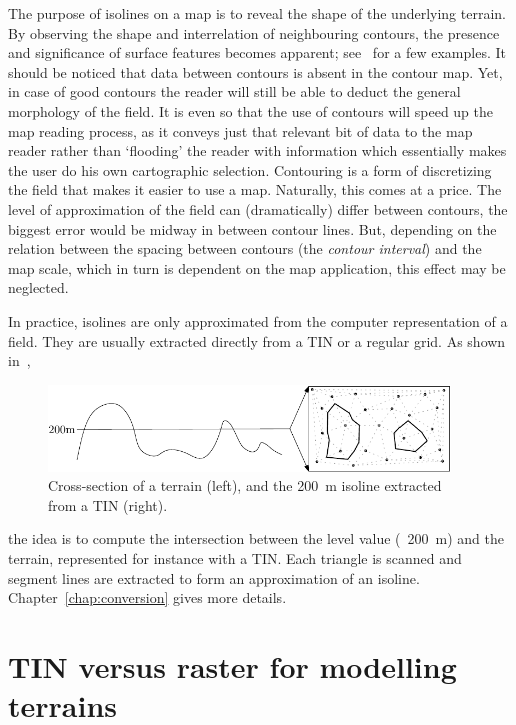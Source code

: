The purpose of isolines on a map is to reveal the shape of the underlying terrain. 
By observing the shape and interrelation of neighbouring contours, the presence and significance of surface features becomes apparent; see~ for a few examples.
It should be noticed that data between contours is absent in the contour map. 
Yet, in case of good contours the reader will still be able to deduct the general morphology of the field. 
It is even so that the use of contours will speed up the map reading process, as it conveys just that relevant bit of data to the map reader rather than `flooding' the reader with information which essentially makes the user do his own cartographic selection. 
Contouring is a form of discretizing the field that makes it easier to use a map. 
Naturally, this comes at a price. 
The level of approximation of the field can (dramatically) differ between contours, the biggest error would be midway in between contour lines. 
But, depending on the relation between the spacing between contours (the \emph{contour interval}) and the map scale, which in turn is dependent on the map application, this effect may be neglected.


%

In practice, isolines are only approximated from the computer representation of a field.
They are usually extracted directly from a TIN or a regular grid. 
As shown in~,
\begin{figure}
  \centering
  \includegraphics[width=0.95\textwidth]{figs/isoline}
  \caption{Cross-section of a terrain (left), and the \SI{200}{\m} isoline extracted from a TIN (right).} 
\end{figure}
the idea is to compute the intersection between the level value (\eg\ \SI{200}{\m}) and the terrain, represented for instance with a TIN\@. 
Each triangle is scanned and segment lines are extracted to form an approximation of an isoline.
Chapter~\ref{chap:conversion} gives more details.

%
\section[TIN versus raster]{TIN versus raster for modelling terrains}

